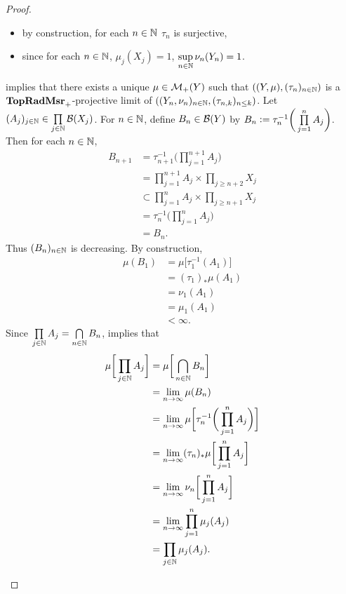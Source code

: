 \documentclass{book}
\begin{document}
\begin{proof}
\begin{itemize}
\begin{itemize}
			\item by construction, for each $n \in \mathbb{N}$ $\tau_n$ is surjective,
			\item since for each $n \in \mathbb{N}$, $\mu_j(X_j) = 1$, $\sup\limits_{n \in \mathbb{N}} \nu_n(Y_n) = 1$.
		\end{itemize}
		 implies that there exists a unique $\mu \in \mathcal{M}_+(Y)$ such that $((Y, \mu), (\tau_n)_{n \in \mathbb{N}})$ is a $\operatorname*{\text{\textbf{TopRadMsr}}_{+}}$-projective limit of $((Y_n, \nu_n)_{n \in \mathbb{N}}, (\tau_{n,k})_{n \leq k})$. Let $(A_j)_{j \in \mathbb{N}} \in \prod\limits_{j \in \mathbb{N}} \mathcal{B}(X_j)$. For $n \in \mathbb{N}$, define $B_n \in \mathcal{B}(Y)$ by $B_n \vcentcolon= \tau_n^{-1} \bigg( \prod\limits_{j=1}^n A_j \bigg)$. Then for each $n \in \mathbb{N}$, 
		\begin{align*}
			B_{n+1}
			& = \tau_{n+1}^{-1} \bigg( \prod\limits_{j=1}^{n+1} A_j \bigg) \\
			& = \prod\limits_{j=1}^{n+1} A_j \times \prod\limits_{j \geq n+2} X_j \\
			& \subset \prod\limits_{j=1}^n A_j \times \prod\limits_{j \geq n+1} X_j \\
			& = \tau_n^{-1} \bigg( \prod\limits_{j=1}^n A_j \bigg) \\
			& = B_n.
		\end{align*}
		Thus $(B_n)_{n \in \mathbb{N}}$ is decreasing. By construction, 
		\begin{align*}
			\mu(B_1)
			& = \mu \bigg[ \tau_1^{-1} (A_1) \bigg] \\
			& = (\tau_1)_* \mu(A_1) \\
			& = \nu_1(A_1) \\
			& = \mu_1(A_1) \\
			& < \infty. 
		\end{align*}	
		Since $\prod\limits_{j \in \mathbb{N}} A_j = \bigcap\limits_{n \in \mathbb{N}} B_n$,  implies that
		\begin{align*}
			\mu \bigg[ \prod_{j \in \mathbb{N}} A_j \bigg]
			& = \mu \bigg[ \bigcap\limits_{n \in \mathbb{N}} B_n \bigg] \\
			& = \lim_{n \rightarrow \infty} \mu (B_n) \\
			& = \lim_{n \rightarrow \infty} \mu \bigg[ \tau_n^{-1} \bigg( \prod\limits_{j=1}^n A_j \bigg) \bigg] \\
			& = \lim_{n \rightarrow \infty} (\tau_n)_*\mu \bigg[ \prod\limits_{j=1}^n A_j  \bigg] \\
			& = \lim_{n \rightarrow \infty} \nu_n \bigg[ \prod\limits_{j=1}^n A_j  \bigg] \\
			& = \lim_{n \rightarrow \infty} \prod_{j=1}^n \mu_j(A_j) \\
			& = \prod_{j \in \mathbb{N}} \mu_j(A_j).
		\end{align*}
		

\end{itemize}
\end{proof}
\end{document}
